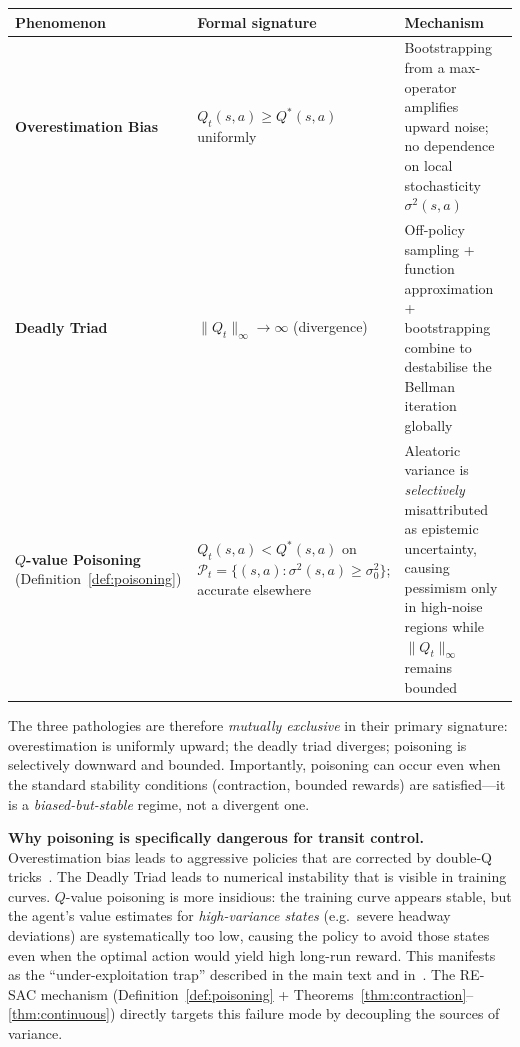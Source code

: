 \medskip
\begin{center}
\begin{tabular}{p{3.0cm}p{3.8cm}p{4.5cm}}
\toprule
\textbf{Phenomenon} & \textbf{Formal signature} & \textbf{Mechanism} \\
\midrule
\textbf{Overestimation Bias}
  \cite{VanHasselt2010DoubleQ,Fujimoto2018TD3}
& $Q_t(s,a) \ge Q^*(s,a)$ uniformly
& Bootstrapping from a max-operator amplifies upward noise; no dependence on local stochasticity $\sigma^2(s,a)$ \\
\addlinespace
\textbf{Deadly Triad}
  \cite{Fujimoto2018TD3}
& $\|Q_t\|_\infty \to \infty$ (divergence)
& Off-policy sampling + function approximation + bootstrapping combine to destabilise the Bellman iteration globally \\
\addlinespace
\textbf{$Q$-value Poisoning}
  (Definition~\ref{def:poisoning})
& $Q_t(s,a) < Q^*(s,a)$ on $\mathcal{P}_t = \{(s,a) : \sigma^2(s,a) \ge \sigma^2_0\}$;
  accurate elsewhere
& Aleatoric variance is \emph{selectively} misattributed as epistemic uncertainty, causing pessimism only in high-noise regions while $\|Q_t\|_\infty$ remains bounded \\
\bottomrule
\end{tabular}
\end{center}

\medskip
\noindent The three pathologies are therefore \emph{mutually exclusive} in their primary signature:
overestimation is uniformly upward; the deadly triad diverges; poisoning is
selectively downward and bounded.  Importantly, poisoning can occur even when
the standard stability conditions (contraction, bounded rewards) are satisfied---it
is a \emph{biased-but-stable} regime, not a divergent one.

\medskip
\noindent\textbf{Why poisoning is specifically dangerous for transit control.}
Overestimation bias leads to aggressive policies that are corrected by double-Q
tricks~\cite{VanHasselt2010DoubleQ}.  The Deadly Triad leads to numerical
instability that is visible in training curves.  $Q$-value poisoning is more
insidious: the training curve appears stable, but the agent's value estimates
for \emph{high-variance states} (e.g.\ severe headway deviations) are
systematically too low, causing the policy to avoid those states even when the
optimal action would yield high long-run reward.  This manifests as the
``under-exploitation trap'' described in the main text and in~\cite{Ji2024SeizingSerendipity}.
The RE-SAC mechanism (Definition~\ref{def:poisoning} + Theorems~\ref{thm:contraction}--\ref{thm:continuous}) directly targets this failure mode by decoupling the sources of variance.
